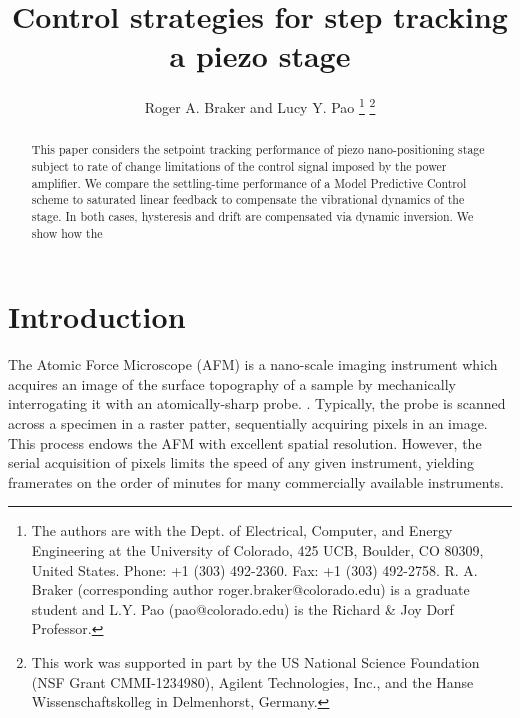 \documentclass[journal,twocolumn,twoside]{IEEEtran}
\begin{document}
\title{Control strategies for step tracking a piezo stage}
\author{Roger A. Braker and Lucy Y. Pao
  \thanks{The authors are with the Dept. of Electrical, Computer, and Energy Engineering at the University of Colorado, 425 UCB, Boulder, CO 80309, United States. Phone: +1 (303) 492-2360. Fax: +1 (303) 492-2758.
    R. A.  Braker (corresponding author roger.braker@colorado.edu) is a graduate student and
    L.Y. Pao (pao@colorado.edu) is the Richard \& Joy Dorf Professor.}
  \thanks{This work was supported in part by the US National Science Foundation (NSF Grant CMMI-1234980), Agilent Technologies, Inc., and the Hanse Wissenschaftskolleg in Delmenhorst, Germany.}
}

\maketitle
\begin{abstract}
  This paper considers the setpoint tracking performance of piezo nano-positioning stage subject to rate of change limitations of the control signal imposed by the power amplifier. We compare the settling-time performance of a Model Predictive Control scheme to saturated linear feedback to compensate the vibrational dynamics of the stage. In both cases, hysteresis and drift are compensated via dynamic inversion. We show how the 
\end{abstract}


\section{Introduction}\label{sec:intro}

The Atomic Force Microscope (AFM) is a nano-scale imaging instrument which acquires an image of the surface topography of a sample by mechanically interrogating it with an atomically-sharp probe.  \cite{abramovitch_tutorial_2007}. Typically, the probe is scanned across a specimen in a raster patter, sequentially acquiring pixels in an image. This process endows the AFM with excellent spatial resolution. However, the serial acquisition of pixels limits the speed of any given instrument, yielding framerates on the order of minutes for many commercially available instruments.
\end{document}

